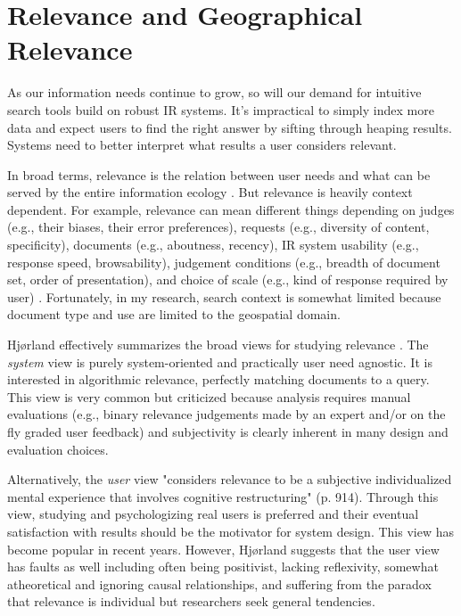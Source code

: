 \section{Relevance and Geographical Relevance}

As our information needs continue to grow, so will our demand for intuitive search tools build on robust IR systems. It's impractical to simply index more data and expect users to find the right answer by sifting through heaping results. Systems need to better interpret what results a user considers relevant.


In broad terms, relevance is the relation between user needs and what can be served by the entire information ecology \cite{Hjorland2010}. But relevance is heavily context dependent. For example, relevance can mean different things depending on judges (e.g., their biases, their error preferences), requests (e.g., diversity of content, specificity), documents (e.g., aboutness, recency), IR system usability (e.g., response speed, browsability), judgement conditions (e.g., breadth of document set, order of presentation), and choice of scale (e.g., kind of response required by user) \cite{Schamber1994}. Fortunately, in my research, search context is somewhat limited because document type and use are limited to the geospatial domain.

Hjørland effectively summarizes the broad views for studying relevance \cite{Hjorland2010}. The \emph{system} view is purely system-oriented and practically user need agnostic. It is interested in algorithmic relevance, perfectly matching documents to a query. This view is very common but criticized because analysis requires manual evaluations (e.g., binary relevance judgements made by an expert and/or on the fly graded user feedback) and subjectivity is clearly inherent in many design and evaluation choices.

Alternatively, the \emph{user} view "considers relevance to be a subjective individualized mental experience that involves cognitive restructuring" \cite{Borlund2003}(p. 914). Through this view, studying and psychologizing real users is preferred and their eventual satisfaction with results should be the motivator for system design. This view has become popular in recent years. However, Hjørland suggests that the user view has faults as well including often being positivist, lacking reflexivity, somewhat atheoretical and ignoring causal relationships, and suffering from the paradox that relevance is individual but researchers seek general tendencies. 


